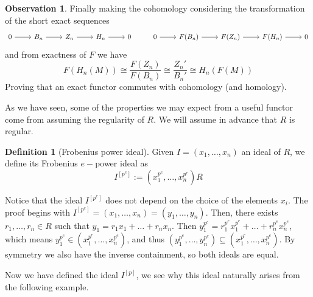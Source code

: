\documentclass[leqno]{article}
\theoremstyle{definition}
\newtheorem{definition}{Definition}[section]
\newtheorem{observation}{Observation}[section]
\begin{document}
\begin{observation}
Finally making the cohomology considering the transformation of the short exact sequences
\[\begin{tikzcd}
	0 & {B_n} & {Z_n} & {H_n} & 0 & 0 & {F(B_n)} & {F(Z_n)} & {F(H_n)} & 0
	\arrow[from=1-1, to=1-2]
	\arrow[from=1-2, to=1-3]
	\arrow[from=1-3, to=1-4]
	\arrow[from=1-4, to=1-5]
	\arrow[from=1-6, to=1-7]
	\arrow[from=1-7, to=1-8]
	\arrow[from=1-8, to=1-9]
	\arrow[from=1-9, to=1-10]
\end{tikzcd}\]
and from exactness of $F$ we have
\[
F(H_n(M)) \cong  \frac{F(Z_n)}{F(B_n)} \cong  \frac{Z_n'}{B_n'} \cong H_n(F(M))
\] 
Proving that an exact functor commutes with cohomology (and homology).
\end{observation}

As we have seen, some of the properties we may expect from a useful functor come from assuming the regularity of $R$. We will assume in advance that $R$ is regular.

\begin{definition}[Frobenius power ideal] Given  $I = (x_1, \ldots, x_n)$ an ideal of $R$, we define its Frobenius $e-$power ideal as
   \[
	 I ^{[p^e]} := (x_1^{p^e}, \ldots, x_n ^{p^e})R
  \] 
\end{definition}
Notice that the ideal $I ^{[p^e]}$ does not depend on the choice of the elements $x_i$. The proof begins with $I ^{[p^e]} = (x_1, \ldots, x_n) = (y_1, \ldots, y_n)$. Then, there exists $r_1, \ldots, r_n \in R$ such that $y_1 = r_1x_1+\ldots+ r_nx_n$. Then $y_1 ^{p^e} = r_1 ^{p^e}x_1 ^{p^e} + \ldots+ r_n^{p^e}x_n^{p^e}$, which means $y_1 ^{p^e} \in (x_1 ^{p^e}, \ldots, x_n ^{p^e})$, and thus $(y_1 ^{p^e}, \ldots, y_n ^{p^e})\subseteq (x_1 ^{p^e}, \ldots, x_n ^{p^e})$. By symmetry we also have the inverse containment, so both ideals are equal.

Now we have defined the ideal $I ^{[p]}$, we see why this ideal naturally arises from the following example.
\end{document}
